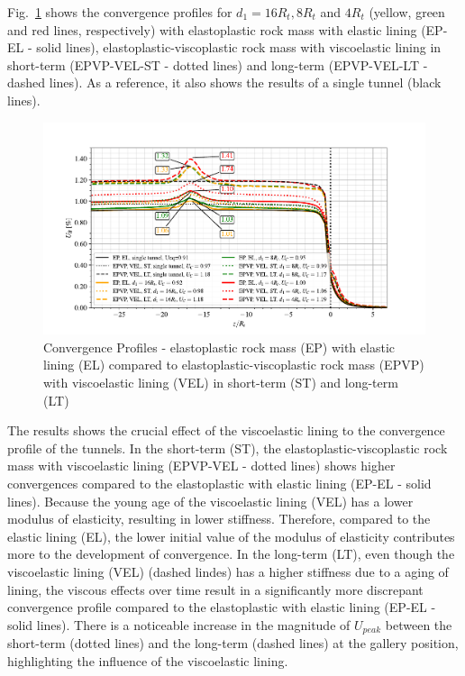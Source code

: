 \documentclass[a4paper,fleqn]{cas-sc}
\begin{document}
Fig.~\ref{EP-EL-EPVP-VEL-WG-ST-LT} shows the convergence profiles for $d_1 = 16R_t, 8R_t$ and $4R_t$ (yellow, green and red lines, respectively) with elastoplastic rock mass with elastic lining (EP-EL - solid lines), elastoplastic-viscoplastic rock mass with viscoelastic lining in short-term (EPVP-VEL-ST - dotted lines) and long-term (EPVP-VEL-LT - dashed lines). As a reference, it also shows the results of a single tunnel (black lines). 

\begin{figure}[h!]
	\centering
	\includegraphics[scale=0.9]{Convergence Profiles - EP_EL_EPVP_VEL_WG_ST_LT_anotate.pdf}
	\caption{Convergence Profiles - elastoplastic rock mass (EP) with elastic lining (EL) compared to elastoplastic-viscoplastic rock mass (EPVP) with viscoelastic lining (VEL) in short-term (ST) and long-term (LT)}
	\label{EP-EL-EPVP-VEL-WG-ST-LT}
\end{figure}
\FloatBarrier

The results shows the crucial effect of the viscoelastic lining to the convergence profile of the tunnels. In the short-term (ST), the elastoplastic-viscoplastic rock mass with viscoelastic lining (EPVP-VEL - dotted lines) shows higher convergences compared to the elastoplastic with elastic lining (EP-EL - solid lines). Because the young age of the viscoelastic lining (VEL) has a lower modulus of elasticity, resulting in lower stiffness. Therefore, compared to the elastic lining (EL), the lower initial value of the modulus of elasticity contributes more to the development of convergence. In the long-term (LT), even though the viscoelastic lining (VEL) (dashed lindes) has a higher stiffness due to a aging of lining, the viscous effects over time result in a significantly more discrepant convergence profile compared to the elastoplastic with elastic lining (EP-EL - solid lines). There is a noticeable increase in the magnitude of $U_{peak}$ between the short-term (dotted lines) and the long-term (dashed lines) at the gallery position, highlighting the influence of the viscoelastic lining.
\end{document}

